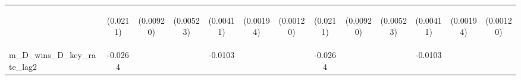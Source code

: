 \documentclass[]{article}
\begin{document}
\begin{center}
\begin{tabular}{lcccccccccccc}
\vspace{4pt} & \begin{footnotesize}(0.0211)\end{footnotesize} & \begin{footnotesize}(0.00920)\end{footnotesize} & \begin{footnotesize}(0.00523)\end{footnotesize} & \begin{footnotesize}(0.00411)\end{footnotesize} & \begin{footnotesize}(0.00194)\end{footnotesize} & \begin{footnotesize}(0.00120)\end{footnotesize} & \begin{footnotesize}(0.0211)\end{footnotesize} & \begin{footnotesize}(0.00920)\end{footnotesize} & \begin{footnotesize}(0.00523)\end{footnotesize} & \begin{footnotesize}(0.00411)\end{footnotesize} & \begin{footnotesize}(0.00194)\end{footnotesize} & \begin{footnotesize}(0.00120)\end{footnotesize} \\
m\_D\_wins\_D\_key\_rate\_lag2 & -0.0264 &  &  & -0.0103 &  &  & -0.0264 &  &  & -0.0103 &  &  \\

\end{tabular}
\end{center}
\end{document}
